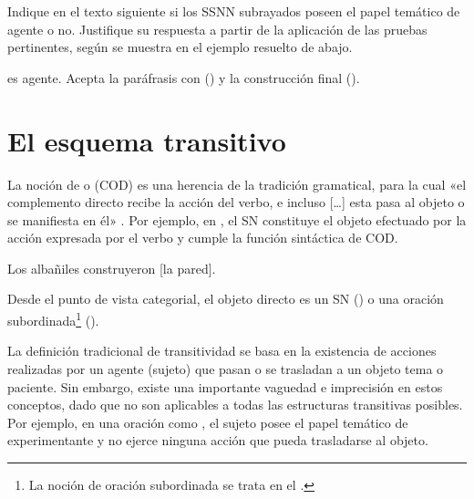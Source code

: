 \begin{ejercicio}\label{ej:07-agente}
Indique en el texto siguiente si los SSNN subrayados poseen el papel temático de
agente o no. Justifique su respuesta a partir de la aplicación de las pruebas
pertinentes, según se muestra en el ejemplo resuelto de abajo.


\begin{resuelto}
 es agente. Acepta la paráfrasis con
 () y la construcción final ().
\end{resuelto}
\end{ejercicio}

\section{El esquema transitivo}\label{sec:07-transitivo}

La noción de  o 
(COD) es una herencia de la tradición gramatical, para la cual «el complemento
directo recibe la acción del verbo, e incluso [\ldots] esta pasa al objeto o se
manifiesta en él» \parencite[§\,34.1e]{rae2025}. Por ejemplo, en
, el SN  constituye el objeto efectuado
por la acción expresada por el verbo y cumple la función sintáctica de COD.

\begin{exe}
  \ex\label{ex:07-albaniles} Los albañiles construyeron [la pared].
\end{exe}

Desde el punto de vista categorial, el objeto directo es un SN () o una oración
subordinada\footnote{La noción de oración subordinada se trata en el
.} ().

La definición tradicional de transitividad se basa en la existencia de acciones
realizadas por un agente (sujeto) que pasan o se trasladan a un objeto tema o
paciente. Sin embargo, existe una importante vaguedad e imprecisión en estos
conceptos, dado que no son aplicables a todas las estructuras transitivas
posibles. Por ejemplo, en una oración como , el sujeto
posee el papel temático de experimentante y no ejerce ninguna acción que pueda
trasladarse al objeto.

